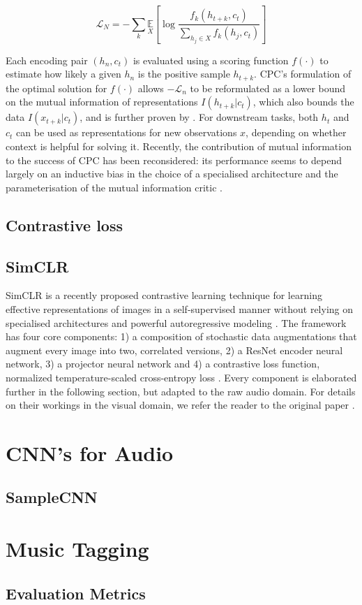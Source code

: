 \begin{equation}
    \mathcal{L}_{N}=-\sum_{k} \underset{X}{\mathbb{E}}\left[\log \frac{f_{k}\left(h_{t+k}, c_{t}\right)}{\sum_{h_{j} \in X} f_{k}\left(h_{j}, c_{t}\right)}\right]
\end{equation}

Each encoding pair $(h_n, c_t)$ is evaluated using a scoring function $f(\cdot)$ to estimate how likely a given $h_n$ is the positive sample $h_{t+k}$. CPC's formulation of the optimal solution for $f(\cdot)$ allows $-\mathcal{L}_n$ to be reformulated as a lower bound on the mutual information of representations $I(h_{t+k} | c_t)$, which also bounds the data $I(x_{t+k} | c_t)$, and is further proven by \cite{poole_variational_2019}. For downstream tasks, both $h_t$ and $c_t$ can be used as representations for new observations $x$, depending on whether context is helpful for solving it. Recently, the contribution of mutual information to the success of CPC has been reconsidered: its performance seems to depend largely on an inductive bias in the choice of a specialised architecture and the parameterisation of the mutual information critic \cite{Tschannen2020OnMI}.



\subsection{Contrastive loss}

\subsection{SimCLR}
SimCLR is a recently proposed contrastive learning technique for learning effective representations of images in a self-supervised manner without relying on specialised architectures and powerful autoregressive modeling \cite{chen_simple_2020}. The framework has four core components: 1) a composition of stochastic data augmentations that augment every image into two, correlated versions, 2) a ResNet encoder neural network, 3) a projector neural network and 4) a contrastive loss function, normalized temperature-scaled cross-entropy loss \cite{chen_simple_2020}. Every component is elaborated further in the following section, but adapted to the raw audio domain. For details on their workings in the visual domain, we refer the reader to the original paper \cite{chen_simple_2020}.


\section{CNN's for Audio}

\subsection{SampleCNN}

\section{Music Tagging}

\subsection{Evaluation Metrics}

